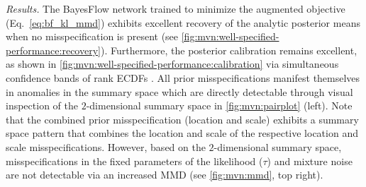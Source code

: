 \documentclass[twoside,11pt]{article}
\newcommand{\0}{\boldsymbol{0}}
\renewcommand{\cite}[1]{\citep{#1}}
\begin{document}
\textit{Results.}
The BayesFlow network trained to minimize the augmented objective (Eq.~\ref{eq:bf_kl_mmd}) exhibits excellent recovery of the analytic posterior means when no misspecification is present (see \autoref{fig:mvn:well-specified-performance:recovery}). %
Furthermore, the posterior calibration \citep[SBC;][]{talts_validating_2020} remains excellent, as shown in \autoref{fig:mvn:well-specified-performance:calibration} via simultaneous confidence bands of rank ECDFs \cite{sailynoja_graphical_2021}.
All prior misspecifications manifest themselves in anomalies in the summary space which are directly detectable through visual inspection of the $2$-dimensional summary space in \autoref{fig:mvn:pairplot} (left). 
Note that the combined prior misspecification (location and scale) exhibits a summary space pattern that combines the location and scale of the respective location and scale misspecifications.
However, based on the $2$-dimensional summary space, misspecifications in the fixed parameters of the likelihood ($\tau$) and mixture noise are not detectable via an increased MMD (see \autoref{fig:mvn:mmd}, top right).
\end{document}
